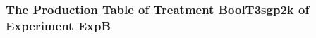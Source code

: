  \begin{frame}
 \fontsize{8pt}{9pt}\selectfont
 \frametitle{ The Production Table of Treatment BoolT3sgp2k of Experiment ExpB }

 \label{ExpBGrammarTable018.tex}  
 \end{frame}

